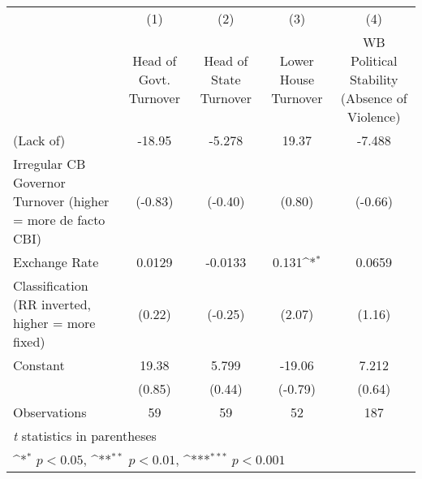 {
\def\sym#1{\ifmmode^{#1}\else\(^{#1}\)\fi}
\begin{tabular}{l*{4}{c}}
\toprule
                &\multicolumn{1}{c}{(1)}&\multicolumn{1}{c}{(2)}&\multicolumn{1}{c}{(3)}&\multicolumn{1}{c}{(4)}\\
                &\multicolumn{1}{c}{Head of Govt. Turnover}&\multicolumn{1}{c}{Head of State Turnover}&\multicolumn{1}{c}{Lower House Turnover}&\multicolumn{1}{c}{WB Political Stability (Absence of Violence)}\\
\midrule
(Lack of)       &   -18.95         &   -5.278         &    19.37         &   -7.488         \\
Irregular CB Governor Turnover (higher = more de facto CBI)&  (-0.83)         &  (-0.40)         &   (0.80)         &  (-0.66)         \\
\addlinespace
Exchange Rate   &   0.0129         &  -0.0133         &    0.131\sym{*}  &   0.0659         \\
Classification (RR inverted, higher = more fixed)&   (0.22)         &  (-0.25)         &   (2.07)         &   (1.16)         \\
\addlinespace
Constant        &    19.38         &    5.799         &   -19.06         &    7.212         \\
                &   (0.85)         &   (0.44)         &  (-0.79)         &   (0.64)         \\
\midrule
Observations    &       59         &       59         &       52         &      187         \\
\bottomrule
\multicolumn{5}{l}{\footnotesize \textit{t} statistics in parentheses}\\
\multicolumn{5}{l}{\footnotesize \sym{*} \(p<0.05\), \sym{**} \(p<0.01\), \sym{***} \(p<0.001\)}\\
\end{tabular}
}
